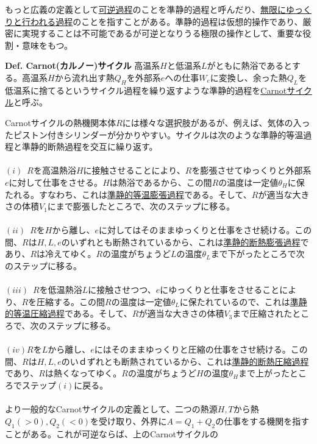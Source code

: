 \documentclass{jsarticle}
\begin{document}
もっと広義の定義として\underline{可逆過程}のことを準静的過程と呼んだり、\underline{無限にゆっくりと行われる過程}のことを指すことがある。準静的過程は仮想的操作であり、厳密に実現することは不可能であるが可逆となりうる極限の操作として、重要な役割・意味をもつ。\\
\hypertarget{Carnotサイクル}{}
\begin{itembox}[l]{\textbf{Def. Carnot(カルノー)サイクル}}
高温系\(H\)と低温系\(L\)がともに熱浴であるとする。高温系\(H\)から流れ出す熱\(Q_{H}\)を外部系\(e\)への仕事\(W_{e}\)に変換し、余った熱\(Q_{L}\)を低温系に捨てるというサイクル過程を繰り返すような準静的過程を\underline{Carnotサイクル}と呼ぶ。
\end{itembox}
Carnotサイクルの熱機関本体\(R\)には様々な選択肢があるが、例えば、気体の入ったピストン付きシリンダーが分かりやすい。サイクルは次のような準静的等温過程と準静的断熱過程を交互に繰り返す。\\
\\
\((i)\)~\(R\)を高温熱浴\(H\)に接触させることにより、\(R\)を膨張させてゆっくりと外部系\(e\)に対して仕事をさせる。\(H\)は熱浴であるから、この間\(R\)の温度は一定値\(\theta_{H}\)に保たれる。すなわち、これは\underline{準静的等温膨張過程}である。そして、\(R\)が適当な大きさの体積\(V_{1}\)にまで膨張したところで、次のステップに移る。\\
\\
\((ii)\)~\(R\)を\(H\)から離し、\(e\)に対してはそのままゆっくりと仕事をさせ続ける。この間、\(R\)は\(H,L,e\)のいずれとも断熱されているから、これは\underline{準静的断熱膨張過程}であり、\(R\)は冷えてゆく。\(R\)の温度がちょうど\(L\)の温度\(\theta_{L}\)まで下がったところで次のステップに移る。\\
\\
\((iii)\)~\(R\)を低温熱浴\(L\)に接触させつつ、\(e\)にゆっくりと仕事をさせることにより、\(R\)を圧縮する。この間\(R\)の温度は一定値\(\theta_{L}\)に保たれているので、これは\underline{準静的等温圧縮過程}である。そして、\(R\)が適当な大きさの体積\(V_{3}\)まで圧縮されたところで、次のステップに移る。\\
\\
\((iv)\)\(R\)を\(L\)から離し、\(e\)にはそのままゆっくりと圧縮の仕事をさせ続ける。この間、\(R\)は\(H,L,e\)のいｄずれとも断熱されているから、これは\underline{準静的断熱圧縮過程}であり、\(R\)は熱くなってゆく。\(R\)の温度がちょうど\(H\)の温度\(\theta_{H}\)まで上がったところでステップ\((i)\)に戻る。\\
\\
より一般的なCarnotサイクルの定義として、二つの熱源\(H,T\)から熱\(Q_{1}(>0),Q_{2}(<0)\)を受け取り、外界に\(A=Q_{1}+Q_{2}\)の仕事をする機関を指すことがある。これが可逆ならば、上のCarnotサイクルの
\end{document}
